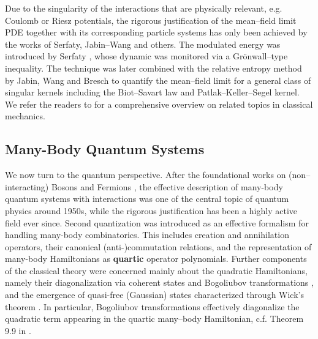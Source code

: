 Due to the singularity of the interactions that are physically relevant, e.g. Coulomb or Riesz potentials, the rigorous justification of the mean--field limit PDE together with its corresponding particle systems has only been achieved by the works of Serfaty, Jabin--Wang and others. The modulated energy was introduced by Serfaty \cite{S20}, whose dynamic was monitored via a Grönwall--type inequality. The technique was later combined with the relative entropy method by Jabin, Wang and Bresch \cite{JW18,BJW19} to quantify the mean--field limit for a general class of singular kernels including the Biot--Savart law and Patlak--Keller--Segel kernel. We refer the readers to \cite{serfaty2024lecturescoulombrieszgases} for a comprehensive overview on related topics in classical mechanics.

\subsection{Many-Body Quantum Systems}\label{sec:intro:MB Quantum}

We now turn to the quantum perspective. After the foundational works on (non--interacting) Bosons and Fermions \cite{Bose1924, Einstein1925,Pauli1925,Fermi1926,Dirac1926}, the effective description of many-body quantum systems with interactions \cite{Lee1957A,Lee1957B,Lee1958} was one of the central topic of quantum physics around 1950s, while the rigorous justification has been a highly active field ever since. Second quantization was introduced as an effective formalism for handling many-body combinatorics. This includes creation and annihilation operators, their canonical (anti-)commutation relations, and the representation of many-body Hamiltonians as \textbf{quartic} operator polynomials. Further components of the classical theory were concerned mainly about the quadratic Hamiltonians, namely their diagonalization via coherent states \cite{Schrodinger1926,Glauber1963A,Glauber1963B} and Bogoliubov transformations \cite{Bogoliubov1947}, and the emergence of quasi-free (Gaussian) states characterized through Wick’s theorem \cite{Bratteli1987}. In particular, Bogoliubov transformations effectively diagonalize the quadratic term appearing in the quartic many--body Hamiltonian, c.f. Theorem 9.9 in \cite{Solovej2014}. \\

